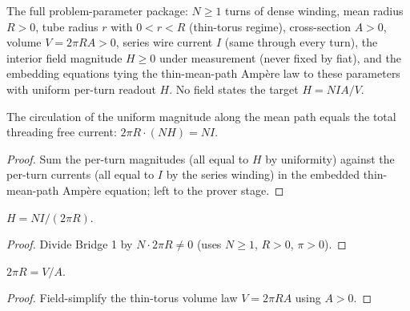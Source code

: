 \begin{definition}
\label{def:IPhO2026Problems_problem_IPhO_2026_3_A_1:ParamagneticTorusA1}
The full problem-parameter package: $N \ge 1$ turns of dense winding, mean
radius $R > 0$, tube radius $r$ with $0 < r < R$ (thin-torus regime),
cross-section $A > 0$, volume $V = 2\pi R A > 0$, series wire current $I$
(same through every turn), the interior field magnitude $H \ge 0$ under
measurement (never fixed by fiat), and the embedding equations tying the
thin-mean-path Ampère law to these parameters with uniform per-turn
readout $H$. No field states the target $H = NIA/V$.
\end{definition}

\begin{lemma}
\label{lem:IPhO2026Problems_problem_IPhO_2026_3_A_1:ampere_uniform_eq}
The circulation of the uniform magnitude along the mean path equals the
total threading free current: $2\pi R \cdot (N H) = N I$.
\end{lemma}
\begin{proof}
Sum the per-turn magnitudes (all equal to $H$ by uniformity) against the
per-turn currents (all equal to $I$ by the series winding) in the embedded
thin-mean-path Ampère equation; left to the prover stage.
\end{proof}

\begin{lemma}
\label{lem:IPhO2026Problems_problem_IPhO_2026_3_A_1:fieldMagnitude_eq_meanRadius_form}
$H = N I / (2\pi R)$.
\end{lemma}
\begin{proof}
Divide Bridge 1 by $N \cdot 2\pi R \neq 0$ (uses $N \ge 1$, $R > 0$,
$\pi > 0$).
\end{proof}

\begin{lemma}
\label{lem:IPhO2026Problems_problem_IPhO_2026_3_A_1:mean_circumference_eq}
$2\pi R = V / A$.
\end{lemma}
\begin{proof}
Field-simplify the thin-torus volume law $V = 2\pi R A$ using $A > 0$.
\end{proof}

